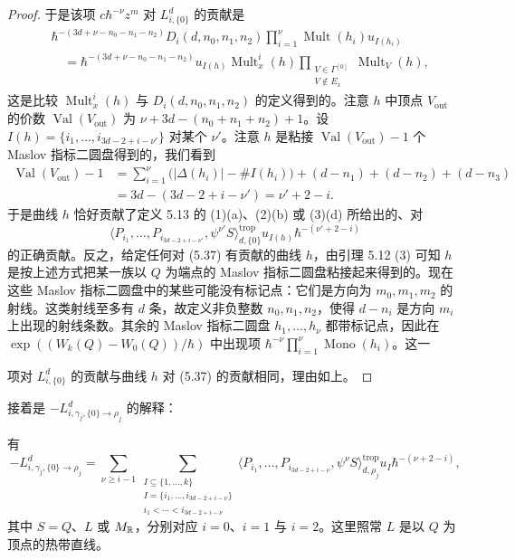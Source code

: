 \begin{proof}
于是该项 $c\hbar^{-\nu}z^m$ 对 $L^d_{i,\{0\}}$ 的贡献是
\[
  \begin{aligned}
    &\hbar^{-(3d+\nu-n_0-n_1-n_2)}D_i(d,n_0,n_1,n_2)\prod_{i=1}^{\nu}\operatorname{Mult}(h_i)u_{I(h_i)}\\
    &\quad=\hbar^{-(3d+\nu-n_0-n_1-n_2)}u_{I(h)}\operatorname{Mult}^i_x(h)
      \prod_{\substack{V\in\Gamma^{[0]}\\ V\notin E_x}}\operatorname{Mult}_V(h),
  \end{aligned}
\]
这是比较 $\operatorname{Mult}^i_x(h)$ 与 $D_i(d,n_0,n_1,n_2)$ 的定义得到的。注意 $h$ 中顶点 $V_{\mathrm{out}}$ 的价数 $\operatorname{Val}(V_{\mathrm{out}})$ 为 $\nu+3d-(n_0+n_1+n_2)+1$。设 $I(h)=\{i_1,\ldots,i_{3d-2+i-\nu'}\}$ 对某个 $\nu'$。注意 $h$ 是粘接 $\operatorname{Val}(V_{\mathrm{out}})-1$ 个 Maslov 指标二圆盘得到的，我们看到
\[
  \begin{aligned}
    \operatorname{Val}(V_{\mathrm{out}})-1
    &=\sum_{i=1}^{\nu}\bigl(|\Delta(h_i)|-\#I(h_i)\bigr)+(d-n_1)+(d-n_2)+(d-n_3)\\
    &=3d-(3d-2+i-\nu')=\nu'+2-i.
  \end{aligned}
\]
于是曲线 $h$ 恰好贡献了定义 5.13 的 (1)(a)、(2)(b) 或 (3)(d) 所给出的、对
\begin{equation}
  \langle P_{i_1},\ldots,P_{i_{3d-2+i-\nu'}},\psi^{\nu'}S\rangle^{\mathrm{trop}}_{d,\{0\}}u_{I(h)}\hbar^{-(\nu'+2-i)} \tag{5.37}
\end{equation}
的正确贡献。反之，给定任何对 (5.37) 有贡献的曲线 $h$，由引理 5.12 (3) 可知 $h$ 是按上述方式把某一族以 $Q$ 为端点的 Maslov 指标二圆盘粘接起来得到的。现在这些 Maslov 指标二圆盘中的某些可能没有标记点：它们是方向为 $m_0,m_1,m_2$ 的射线。这类射线至多有 $d$ 条，故定义非负整数 $n_0,n_1,n_2$，使得 $d-n_i$ 是方向 $m_i$ 上出现的射线条数。其余的 Maslov 指标二圆盘 $h_1,\ldots,h_\nu$ 都带标记点，因此在 $\exp((W_k(Q)-W_0(Q))/\hbar)$ 中出现项 $\hbar^{-\nu}\prod_{i=1}^{\nu}\operatorname{Mono}(h_i)$。这一

项对 $L^d_{i,\{0\}}$ 的贡献与曲线 $h$ 对 (5.37) 的贡献相同，理由如上。
\end{proof}


接着是 $-L^d_{i,\gamma_j,\{0\}\to\rho_j}$ 的解释：

\begin{lemma}
有
\[
  -L^d_{i,\gamma_j,\{0\}\to\rho_j}
  =\sum_{\nu\ge i-1}\sum_{\substack{I\subseteq\{1,\ldots,k\}\\ I=\{i_1,\ldots,i_{3d-2+i-\nu}\}\\ i_1<\cdots<i_{3d-2+i-\nu}}}
  \langle P_{i_1},\ldots,P_{i_{3d-2+i-\nu}},\psi^\nu S\rangle^{\mathrm{trop}}_{d,\rho_j}u_I\hbar^{-(\nu+2-i)},
\]
其中 $S=Q$、$L$ 或 $M_{\mathbb{R}}$，分别对应 $i=0$、$i=1$ 与 $i=2$。这里照常 $L$ 是以 $Q$ 为顶点的热带直线。
\end{lemma}


